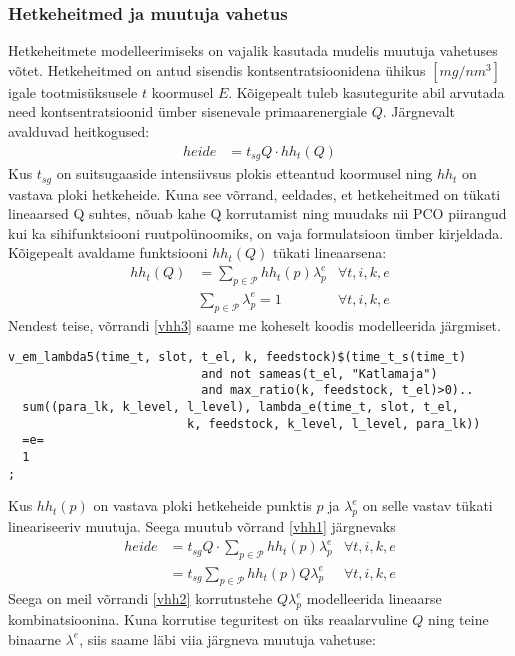 \documentclass[10pt,a4paper]{article}
\begin{document}
\subsubsection{Hetkeheitmed ja muutuja vahetus}
Hetkeheitmete modelleerimiseks on vajalik kasutada mudelis muutuja vahetuses võtet. Hetkeheitmed on antud sisendis kontsentratsioonidena ühikus $[ mg/nm^3 ]$ igale tootmisüksusele $t$ koormusel $E$. Kõigepealt tuleb kasutegurite abil arvutada need kontsentratsioonid ümber sisenevale primaarenergiale $Q$. Järgnevalt avalduvad heitkogused:
\begin{align}
heide &= t_{sg} Q \cdot hh_{t}(Q) \label{vhh1}
\end{align} 
Kus $t_{sg}$ on suitsugaaside intensiivsus plokis etteantud koormusel ning $hh_{t}$ on vastava ploki hetkeheide. Kuna see võrrand, eeldades, et hetkeheitmed on tükati lineaarsed Q suhtes, nõuab kahe Q korrutamist ning muudaks nii PCO piirangud kui ka sihifunktsiooni ruutpolünoomiks, on vaja formulatsioon ümber kirjeldada. Kõigepealt avaldame funktsiooni $hh_t(Q)$ tükati lineaarsena:
\begin{align}
hh_t(Q) &= \sum_{p \in \mathcal{P}} hh_t(p) \lambda^e_p & \forall t, i,k,e \\
        & \sum_{p \in \mathcal{P}} \lambda^e_p = 1 & \forall t, i,k,e \label{vhh3}
\end{align}
Nendest teise, võrrandi \ref{vhh3} saame me koheselt koodis modelleerida järgmiset.
\begin{verbatim}
v_em_lambda5(time_t, slot, t_el, k, feedstock)$(time_t_s(time_t)
                           and not sameas(t_el, "Katlamaja")
                           and max_ratio(k, feedstock, t_el)>0)..
  sum((para_lk, k_level, l_level), lambda_e(time_t, slot, t_el,
                         k, feedstock, k_level, l_level, para_lk))
  =e=
  1
;
\end{verbatim}
Kus $hh_t(p)$ on vastava ploki hetkeheide punktis $p$ ja $\lambda^e_p$ on selle vastav tükati lineariseeriv muutuja. Seega muutub võrrand \ref{vhh1} järgnevaks
\begin{align}
heide &= t_{sg} Q \cdot \sum_{p \in \mathcal{P}} hh_t(p) \lambda^e_p  & \forall t,i,k,e \\
      &= t_{sg} \sum_{p \in \mathcal{P}} hh_t(p) Q \lambda^e_p  & \forall t, i, k, e \label{vhh2}
\end{align}
Seega on meil võrrandi \ref{vhh2} korrutustehe $Q \lambda^e_p$ modelleerida lineaarse kombinatsioonina. Kuna korrutise teguritest on üks reaalarvuline $Q$ ning teine binaarne $\lambda^e$, siis saame läbi viia järgneva muutuja vahetuse:
\end{document}
